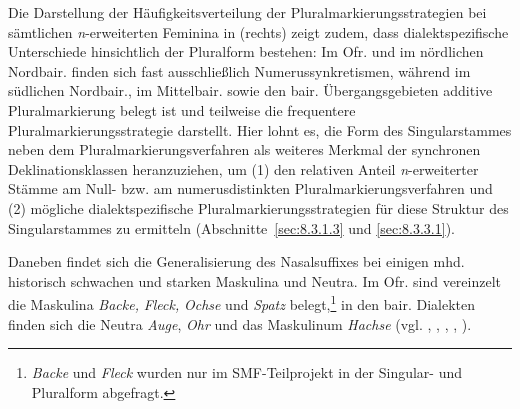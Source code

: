 \begin{sloppypar}
Die Darstellung der Häufigkeitsverteilung der Pluralmarkierungsstrategien bei sämtlichen \textit{n}{}-erweiterten Feminina in  (rechts) zeigt zudem, dass dialektspezifische Unterschiede hinsichtlich der Pluralform bestehen: Im Ofr. und im nördlichen Nordbair. finden sich fast ausschließlich Numerussynkretismen, während im südlichen Nordbair., im Mittelbair. sowie den bair. Übergangsgebieten additive Pluralmarkierung belegt ist und teilweise die frequentere Pluralmarkierungsstrategie darstellt. Hier lohnt es, die Form des Singularstammes neben dem Pluralmarkierungsverfahren als weiteres Merkmal der synchronen Deklinationsklassen heranzuziehen, um (1) den relativen Anteil \textit{n}{}-erweiterter Stämme am Null- bzw. am numerusdistinkten Pluralmarkierungsverfahren und (2) mögliche dialektspezifische Pluralmarkierungsstrategien für diese Struktur des Singularstammes zu ermitteln (Abschnitte~\ref{sec:8.3.1.3} und \ref{sec:8.3.3.1}).
\end{sloppypar}

Daneben findet sich die Generalisierung des Nasalsuffixes bei einigen mhd. his\-to\-risch schwachen und starken Maskulina und Neutra. Im Ofr. sind vereinzelt die Maskulina \textit{Backe,} \textit{Fleck,} \textit{Ochse} und \textit{Spatz} belegt,\footnote{\textit{Backe} und \textit{Fleck} wurden nur im SMF-Teilprojekt in der Singular- und Pluralform abgefragt.} in den bair. Dialekten finden sich die Neutra \textit{Auge}, \textit{Ohr} und das Maskulinum \textit{Hachse} (vgl. \citealt[§137]{Kollmer1987}, \citealt[8--9]{Mausser1915}, \citealt[190]{Rowley1997}, \citealt[121]{Steininger1994}, \citealt[147]{Wildfeuer2001}).

